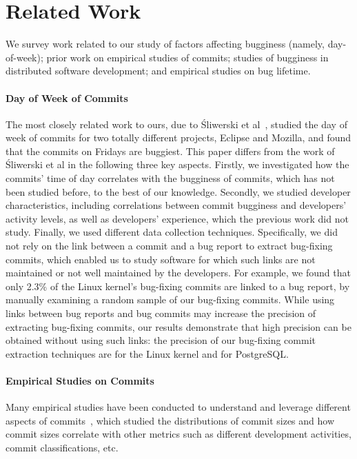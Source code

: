 \section{Related Work}
\label{sec-related}
We survey work related to our study of factors affecting bugginess
(namely, day-of-week); prior work on empirical studies of commits; studies
of bugginess in distributed software development; and empirical studies 
on bug lifetime.

\paragraph{Day of Week of Commits}
The most closely related work to ours, due to \'Sliwerski et al~\cite{sliwerski-msr-2005}, studied the day of week of commits for two totally different projects, Eclipse and Mozilla, and
found that the commits on Fridays are buggiest. 
This paper differs from the work of \'Sliwerski et al in the following three key aspects.
Firstly, we investigated how the commits' time of day correlates with the bugginess of commits, 
which has not been studied before, to the best of our knowledge.
Secondly, we studied developer characteristics, including correlations between commit bugginess and developers' activity levels, as well as 
developers' experience, which the previous work did not study.
Finally, we used different data collection techniques. Specifically, we did not rely on the link 
between a commit and a bug report to extract bug-fixing commits, which enabled us to study 
software for which such links are not maintained or not well maintained by the developers. For example, we 
found that only 2.3\% of the Linux kernel's bug-fixing commits are linked to a bug report, 
by manually examining a random sample of our bug-fixing commits.
While using links between bug reports and bug commits may increase the precision of extracting 
bug-fixing commits, our results demonstrate that 
high precision can be obtained without using such links: 
the precision of our bug-fixing commit extraction techniques are 
\linuxP for the Linux kernel and \postP for PostgreSQL.

\paragraph{Empirical Studies on Commits}
Many empirical studies have been conducted to understand and leverage different aspects of 
commits~\cite{hattori2008nature,largeCommits,commitTextualClassification, smallCommits05, Swanson76}, which 
studied the distributions of commit sizes and how commit sizes correlate with other metrics 
such as different development activities, commit classifications, etc. 

